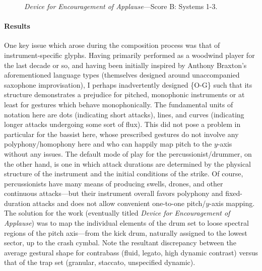     \begin{figure}
        \centering
        \captionsetup{width=.5\textwidth}
        \caption{\textit{Device for Encouragement of Applause}---Score B: Systems 1-3.}
        \label{fig:encouragementB}
    \end{figure}

    \paragraph{Results}
    One key issue which arose during the composition process was that of instrument-specific glyphs. Having primarily performed as a woodwind player for the last decade or so, and having been initially inspired by Anthony Braxton's aforementioned language types (themselves designed around unaccompanied saxophone improvisation), I perhaps inadvertently designed \{O-G\} such that its structure demonstrates a prejudice for pitched, monophonic instruments or at least for gestures which behave monophonically. The fundamental units of notation here are dots (indicating short attacks), lines, and curves (indicating longer attacks undergoing some sort of flux). This did not pose a problem in particular for the bassist here, whose prescribed gestures do not involve any polyphony/homophony here and who can happily map pitch to the $y$-axis without any issues. The default mode of play for the percussionist/drummer, on the other hand, is one in which attack durations are determined by the physical structure of the instrument and the initial conditions of the strike. Of course, percussionists have many means of producing swells, drones, and other continuous attacks---but their instrument overall favors polyphony and fixed-duration attacks and does not allow convenient one-to-one pitch/$y$-axis mapping. The solution for the work (eventually titled \textit{Device for Encouragement of Applause}) was to map the individual elements of the drum set to loose spectral regions of the pitch axis---from the kick drum, naturally assigned to the lowest sector, up to the crash cymbal. Note the resultant discrepancy between the average gestural shape for contrabass (fluid, legato, high dynamic contrast) versus that of the trap set (granular, staccato, unspecified dynamic). 
    
